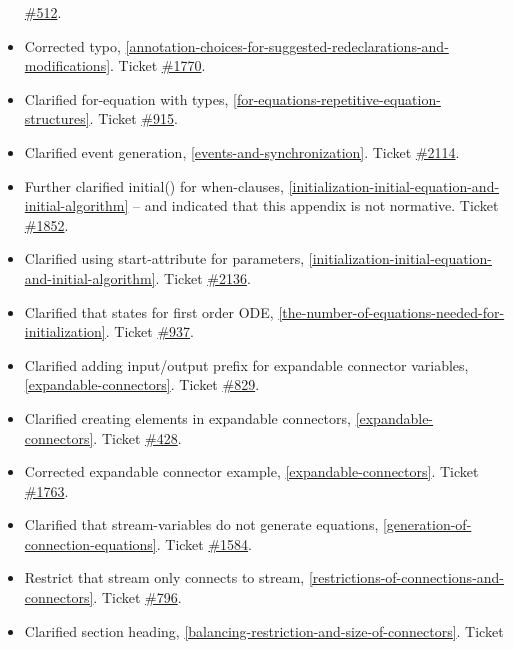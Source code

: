 \documentclass[../MLS.tex]{subfiles}
\begin{document}
\begin{itemize}
  \href{https://trac.modelica.org/Modelica/ticket/512}{\#512}.
\item
  Corrected typo, \autoref{annotation-choices-for-suggested-redeclarations-and-modifications}. Ticket
  \href{https://trac.modelica.org/Modelica/ticket/1770}{\#1770}.
\item
  Clarified for-equation with types, \autoref{for-equations-repetitive-equation-structures}. Ticket
  \href{https://trac.modelica.org/Modelica/ticket/915}{\#915}.
\item
  Clarified event generation, \autoref{events-and-synchronization}. Ticket
  \href{https://trac.modelica.org/Modelica/ticket/2114}{\#2114}.
\item
  Further clarified initial() for when-clauses, \autoref{initialization-initial-equation-and-initial-algorithm} -- and
  indicated that this appendix is not normative. Ticket
  \href{https://trac.modelica.org/Modelica/ticket/1852}{\#1852}.
\item
  Clarified using start-attribute for parameters, \autoref{initialization-initial-equation-and-initial-algorithm}. Ticket
  \href{https://trac.modelica.org/Modelica/ticket/2136}{\#2136}.
\item
  Clarified that states for first order ODE, \autoref{the-number-of-equations-needed-for-initialization}. Ticket
  \href{https://trac.modelica.org/Modelica/ticket/937}{\#937}.
\item
  Clarified adding input/output prefix for expandable connector
  variables, \autoref{expandable-connectors}. Ticket
  \href{https://trac.modelica.org/Modelica/ticket/829}{\#829}.
\item
  Clarified creating elements in expandable connectors, \autoref{expandable-connectors}.
  Ticket \href{https://trac.modelica.org/Modelica/ticket/428}{\#428}.
\item
  Corrected expandable connector example, \autoref{expandable-connectors}. Ticket
  \href{https://trac.modelica.org/Modelica/ticket/1763}{\#1763}.
\item
  Clarified that stream-variables do not generate equations, \autoref{generation-of-connection-equations}. Ticket
  \href{https://trac.modelica.org/Modelica/ticket/1584}{\#1584}.
\item
  Restrict that stream only connects to stream, \autoref{restrictions-of-connections-and-connectors}. Ticket
  \href{https://trac.modelica.org/Modelica/ticket/796}{\#796}.
\item
  Clarified section heading, \autoref{balancing-restriction-and-size-of-connectors}. Ticket

\end{itemize}
\end{document}
